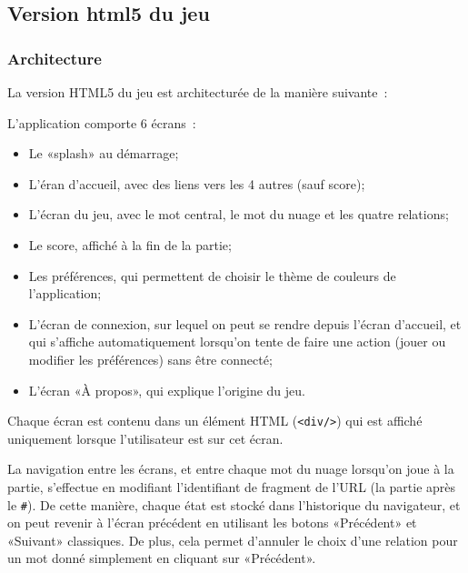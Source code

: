 \documentclass[a4paper,11pt,french]{article}
\begin{document}
\subsection{Version html5 du jeu}
\label{sec:html5}
\subsubsection{Architecture}

La version HTML5 du jeu est architecturée de la manière suivante~:

L'application comporte 6 écrans~:
\begin{itemize}
\item Le «splash» au démarrage;
\item L'éran d'accueil, avec des liens vers les 4 autres (sauf score);
\item L'écran du jeu, avec le mot central, le mot du nuage et les quatre relations;
\item Le score, affiché à la fin de la partie;
\item Les préférences, qui permettent de choisir le thème de couleurs de l'application;
\item L'écran de connexion, sur lequel on peut se rendre depuis l'écran d'accueil, et qui s'affiche automatiquement lorsqu'on tente de faire
  une action (jouer ou modifier les préférences) sans être connecté;
\item L'écran «À propos», qui explique l'origine du jeu.
\end{itemize}
Chaque écran est contenu dans un élément HTML (\verb!<div/>!) qui est affiché uniquement lorsque l'utilisateur est sur cet écran.

La navigation entre les écrans, et entre chaque mot du nuage lorsqu'on joue à la partie, s'effectue en modifiant l'identifiant de fragment
de l'URL (la partie après le \verb!#!). De cette manière, chaque état est stocké dans l'historique du navigateur, et on peut revenir à
l'écran précédent en utilisant les botons «Précédent» et «Suivant» classiques. De plus, cela permet d'annuler le choix d'une relation pour
un mot donné simplement en cliquant sur «Précédent».
\end{document}
